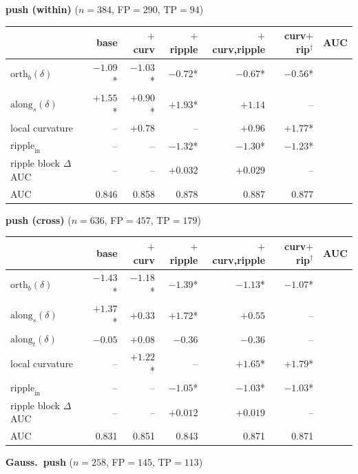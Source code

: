 \begin{table}[t]
\medskip
\textbf{push (within)} ($n=384$, FP$=290$, TP$=94$)

\begin{tabular}{l r r r r r r}
\toprule
 & base & $+$curv & $+$ripple & $+$curv,ripple & curv$+$rip$^\dagger$ & AUC \\
\midrule
$\mathrm{orth}_b(\delta)$ & $-1.09$* & $-1.03$* & $-0.72$* & $-0.67$* & $-0.56$* &  \\
$\mathrm{along}_s(\delta)$ & $+1.55$* & $+0.90$* & $+1.93$* & $+1.14$ & -- &  \\
local curvature & -- & $+0.78$ & -- & $+0.96$ & $+1.77$* &  \\
$\mathrm{ripple}_\mathrm{in}$ & -- & -- & $-1.32$* & $-1.30$* & $-1.23$* &  \\
ripple block $\Delta$AUC & -- & -- & $+0.032$ & $+0.029$ & -- &  \\
AUC & 0.846 & 0.858 & 0.878 & 0.887 & 0.877 &  \\
\bottomrule
\end{tabular}

\medskip
\textbf{push (cross)} ($n=636$, FP$=457$, TP$=179$)

\begin{tabular}{l r r r r r r}
\toprule
 & base & $+$curv & $+$ripple & $+$curv,ripple & curv$+$rip$^\dagger$ & AUC \\
\midrule
$\mathrm{orth}_b(\delta)$ & $-1.43$* & $-1.18$* & $-1.39$* & $-1.13$* & $-1.07$* &  \\
$\mathrm{along}_s(\delta)$ & $+1.37$* & $+0.33$ & $+1.72$* & $+0.55$ & -- &  \\
$\mathrm{along}_t(\delta)$ & $-0.05$ & $+0.08$ & $-0.36$ & $-0.36$ & -- &  \\
local curvature & -- & $+1.22$* & -- & $+1.65$* & $+1.79$* &  \\
$\mathrm{ripple}_\mathrm{in}$ & -- & -- & $-1.05$* & $-1.03$* & $-1.03$* &  \\
ripple block $\Delta$AUC & -- & -- & $+0.012$ & $+0.019$ & -- &  \\
AUC & 0.831 & 0.851 & 0.843 & 0.871 & 0.871 &  \\
\bottomrule
\end{tabular}

\medskip
\textbf{Gauss.\ push} ($n=258$, FP$=145$, TP$=113$)


\end{table}
